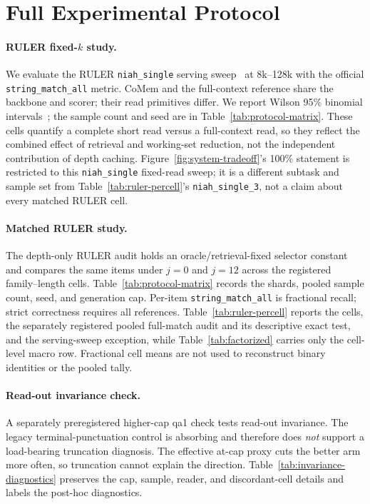 \FloatBarrier

\section{Full Experimental Protocol}
\label{app:protocol-full}

\paragraph{RULER fixed-$k$ study.}
We evaluate the RULER \texttt{niah\_single} serving sweep~\citep{ruler} at 8k--128k with the
official \texttt{string\_match\_all} metric.  CoMem and the full-context
reference share the backbone and scorer; their read primitives differ.  We
report Wilson 95\% binomial intervals~\citep{wilson}; the sample count and seed
are in Table~\ref{tab:protocol-matrix}.  These cells quantify a complete short read versus a
full-context read, so they reflect the combined effect of retrieval and
working-set reduction, not the independent contribution of depth caching.
Figure~\ref{fig:system-tradeoff}'s 100\% statement is restricted to this
\texttt{niah\_single} fixed-read sweep; it is a different subtask and sample
set from Table~\ref{tab:ruler-percell}'s
\texttt{niah\_single\_3}, not a claim about every matched RULER cell.

\paragraph{Matched RULER study.}
The depth-only RULER audit holds an oracle/retrieval-fixed selector constant and
compares the same items under $j=0$ and $j=12$ across the registered
family--length cells.  Table~\ref{tab:protocol-matrix} records the shards,
pooled sample count, seed, and generation cap.  Per-item
\texttt{string\_match\_all} is fractional recall; strict correctness requires
all references.  Table~\ref{tab:ruler-percell} reports the cells, the
separately registered pooled full-match audit and its descriptive exact test,
and the serving-sweep exception, while Table~\ref{tab:factorized} carries only
the cell-level macro row.  Fractional cell
means are not used to reconstruct binary identities or the pooled tally.

\paragraph{Read-out invariance check.}
A separately preregistered higher-cap qa1 check tests read-out invariance.  The
legacy terminal-punctuation control is absorbing and therefore does \emph{not}
support a load-bearing truncation diagnosis.  The effective at-cap proxy cuts
the better arm more often, so truncation cannot explain the direction.
Table~\ref{tab:invariance-diagnostics} preserves the cap, sample,
reader, and discordant-cell details and labels the post-hoc diagnostics.

